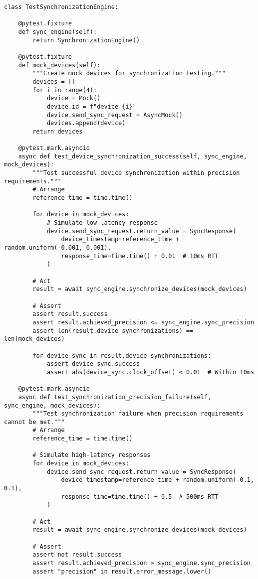 \documentclass[11pt,a4paper]{report}
\begin{document}
\begin{verbatim}
class TestSynchronizationEngine:

    @pytest.fixture
    def sync_engine(self):
        return SynchronizationEngine()

    @pytest.fixture
    def mock_devices(self):
        """Create mock devices for synchronization testing."""
        devices = []
        for i in range(4):
            device = Mock()
            device.id = f"device_{i}"
            device.send_sync_request = AsyncMock()
            devices.append(device)
        return devices

    @pytest.mark.asyncio
    async def test_device_synchronization_success(self, sync_engine, mock_devices):
        """Test successful device synchronization within precision requirements."""
        # Arrange
        reference_time = time.time()

        for device in mock_devices:
            # Simulate low-latency response
            device.send_sync_request.return_value = SyncResponse(
                device_timestamp=reference_time + random.uniform(-0.001, 0.001),
                response_time=time.time() + 0.01  # 10ms RTT
            )

        # Act
        result = await sync_engine.synchronize_devices(mock_devices)

        # Assert
        assert result.success
        assert result.achieved_precision <= sync_engine.sync_precision
        assert len(result.device_synchronizations) == len(mock_devices)

        for device_sync in result.device_synchronizations:
            assert device_sync.success
            assert abs(device_sync.clock_offset) < 0.01  # Within 10ms

    @pytest.mark.asyncio
    async def test_synchronization_precision_failure(self, sync_engine, mock_devices):
        """Test synchronization failure when precision requirements cannot be met."""
        # Arrange
        reference_time = time.time()

        # Simulate high-latency responses
        for device in mock_devices:
            device.send_sync_request.return_value = SyncResponse(
                device_timestamp=reference_time + random.uniform(-0.1, 0.1),
                response_time=time.time() + 0.5  # 500ms RTT
            )

        # Act
        result = await sync_engine.synchronize_devices(mock_devices)

        # Assert
        assert not result.success
        assert result.achieved_precision > sync_engine.sync_precision
        assert "precision" in result.error_message.lower()


\end{verbatim}
\end{document}
